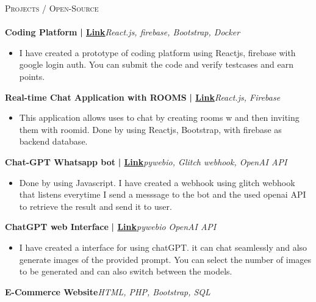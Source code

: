 \documentclass[a4paper]{article}
\newcommand{\lineunder} {
    \vspace*{-8pt} \\
    \hspace*{-18pt} \hrulefill \\
}
\newcommand{\header} [1] {
    {\hspace*{-18pt}\vspace*{6pt} \textsc{#1}}
    \vspace*{-6pt} \lineunder
}
\begin{document}
      \header{Projects / Open-Source}
      \vspace{2mm}
      {\textbf{Coding Platform}}\textbf{ | \href{https://adv-react.vercel.app/}{Link}}\hfill{\sl React.js, firebase, Bootstrap, Docker}\\
          \vspace{-2mm}
\begin{itemize} \itemsep -3pt
\item[] I have created a prototype of coding platform using Reactjs, firebase with google login auth. You can submit the code and verify testcases and earn points.
\end{itemize}
          \vspace*{2mm}
      {\textbf{Real-time Chat Application with ROOMS}}\textbf{ | \href{https://github.com/Vijay1667/chat-application}{Link}}\hfill{\sl React.js, Firebase}\\
          \vspace{-2mm}
\begin{itemize} \itemsep -3pt
\item[] This application allows uses to chat by creating rooms w and then inviting them with roomid. Done by using Reactjs, Bootstrap, with firebase as backend database.
\end{itemize}
          \vspace*{2mm}
      {\textbf{Chat-GPT Whatsapp bot}}\textbf{ | \href{https://github.com/Vijay1667/Chat-GPT-Whatsapp-Bot-}{Link}}\hfill{\sl pywebio, Glitch webhook, OpenAI API}\\
          \vspace{-2mm}
\begin{itemize} \itemsep -3pt
\item[] Done by using Javascript. I have created a webhook using glitch webhook that listens everytime I send a messsage to the bot and the used openai API to retrieve the result and send it to user.
\end{itemize}
          \vspace*{2mm}
      {\textbf{ChatGPT web Interface}}\textbf{ | \href{https://vijay-chatgpt.vercel.app/}{Link}}\hfill{\sl pywebio OpenAI API}\\
          \vspace{-2mm}
\begin{itemize} \itemsep -3pt
\item[] I have created a interface for using chatGPT. it can chat seamlessly and also generate images of the provided prompt. You can select the number of images to be generated and can also switch between the models.
\end{itemize}
          \vspace*{2mm}
      {\textbf{E-Commerce Website}}\hfill{\sl HTML, PHP, Bootstrap, SQL}\\
\end{document}
